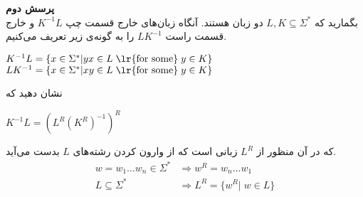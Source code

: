 \textbf{پرسش دوم}\\[0.1in]
بگمارید که 
$L, K \subseteq \Sigma^*$
دو زبان هستند. آنگاه زبان‌های خارج قسمت چپ $K^{-1}L$
و خارج قسمت راست $LK^{-1}$ را به گونه‌ی زیر تعریف می‌کنیم.
\begin{center}
    $K^{-1}L = \{x \in \Sigma^* | yx \in L \; \text{\lr{for some}}
    \; y \in K\}$ \\[0.08in]
    $LK^{-1} = \{x \in \Sigma^* | xy \in L \; \text{\lr{for some}}
    \; y \in K\}$
\end{center}
نشان دهید که
\begin{center}
    $K^{-1}L = (L^R(K^R)^{-1})^R$
\end{center}
که در آن منظور از $L^R$
زبانی است که از وارون کردن رشته‌های $L$
بدست می‌آید.
\begin{equation*}
    \begin{aligned}
        w = w_1\ldots w_n \in \Sigma^* &\Longrightarrow 
        w^R = w_n \ldots w_1 \\[0.07in]
        L \subseteq \Sigma^* &\Longrightarrow L^R = \{
        w^R | \; w \in L \}
    \end{aligned}
\end{equation*}